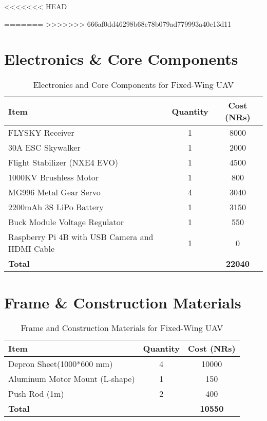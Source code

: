 <<<<<<< HEAD



=======
>>>>>>> 666af0dd46298b68c78b079ad779993a40c13d11
\section*{Electronics \& Core Components}
\begin{table}[h]
\centering
\begin{tabular}{l c S[table-format=5.0]}
\toprule
\textbf{Item} & \textbf{Quantity} & \textbf{Cost (NRs)} \\
\midrule
FLYSKY Receiver & 1 & 8000 \\
30A ESC Skywalker & 1 & 2000 \\
Flight Stabilizer (NXE4 EVO) & 1 & 4500 \\
1000KV Brushless Motor & 1 & 800 \\
MG996 Metal Gear Servo & 4 & 3040 \\
2200mAh 3S LiPo Battery & 1 & 3150 \\
Buck Module Voltage Regulator & 1 & 550 \\
Raspberry Pi 4B with USB Camera and HDMI Cable & 1 & 0 \\
\midrule
\textbf{Total} & & \textbf{22040} \\
\bottomrule
\end{tabular}
\caption{Electronics and Core Components for Fixed-Wing UAV}
\end{table}

\section*{Frame \& Construction Materials}
\begin{table}[h]
\centering
\begin{tabular}{l c S[table-format=5.0]}
\toprule
\textbf{Item} & \textbf{Quantity} & \textbf{Cost (NRs)} \\
\midrule
Depron Sheet(1000*600 mm) & 4 & 10000 \\
Aluminum Motor Mount (L-shape) & 1 & 150 \\
Push Rod (1m) & 2 & 400 \\
\midrule
\textbf{Total} & & \textbf{10550} \\
\bottomrule
\end{tabular}
\caption{Frame and Construction Materials for Fixed-Wing UAV}
\end{table}

